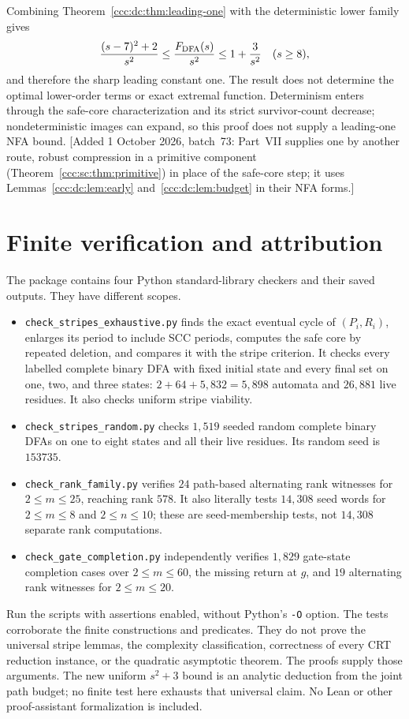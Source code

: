 \documentclass[11pt,letterpaper]{article}
\theoremstyle{definition}
\theoremstyle{remark}
\newcommand{\waddsevthree}[1]{\textup{[}Added 1 October 2026, batch~73: #1\textup{]}}
\begin{document}
Combining Theorem~\ref{ccc:dc:thm:leading-one} with the deterministic lower family gives
\[
\frac{(s-7)^2+2}{s^2}\le\frac{F_{\rm DFA}(s)}{s^2}\le1+\frac3{s^2}
\quad(s\ge8),
\]
and therefore the sharp leading constant one. The result does not determine the optimal lower-order terms or exact extremal function. Determinism enters through the safe-core characterization and its strict survivor-count decrease; nondeterministic images can expand, so this proof does not supply a leading-one NFA bound.
\waddsevthree{Part~VII supplies one by another route, robust compression in a
primitive component (Theorem~\ref{ccc:sc:thm:primitive}) in place of the
safe-core step; it uses Lemmas~\ref{ccc:dc:lem:early}
and~\ref{ccc:dc:lem:budget} in their NFA forms.}

\section{Finite verification and attribution}\label{ccc:dc:sec:checks}

The package contains four Python standard-library checkers and their saved outputs. They have different scopes.
\begin{itemize}
\item \texttt{check\_stripes\_exhaustive.py} finds the exact eventual cycle of $(P_i,R_i)$, enlarges its period to include SCC periods, computes the safe core by repeated deletion, and compares it with the stripe criterion. It checks every labelled complete binary DFA with fixed initial state and every final set on one, two, and three states: $2+64+5{,}832=5{,}898$ automata and $26{,}881$ live residues. It also checks uniform stripe viability.
\item \texttt{check\_stripes\_random.py} checks $1{,}519$ seeded random complete binary DFAs on one to eight states and all their live residues. Its random seed is $153735$.
\item \texttt{check\_rank\_family.py} verifies $24$ path-based alternating rank witnesses for $2\le m\le25$, reaching rank $578$. It also literally tests $14{,}308$ seed words for $2\le m\le8$ and $2\le n\le10$; these are seed-membership tests, not $14{,}308$ separate rank computations.
\item \texttt{check\_gate\_completion.py} independently verifies $1{,}829$ gate-state completion cases over $2\le m\le60$, the missing return at $g$, and $19$ alternating rank witnesses for $2\le m\le20$.
\end{itemize}
Run the scripts with assertions enabled, without Python's \texttt{-O} option. The tests corroborate the finite constructions and predicates. They do not prove the universal stripe lemmas, the complexity classification, correctness of every CRT reduction instance, or the quadratic asymptotic theorem. The proofs supply those arguments. The new uniform $s^2+3$ bound is an analytic deduction from the joint path budget; no finite test here exhausts that universal claim. No Lean or other proof-assistant formalization is included.
\end{document}
